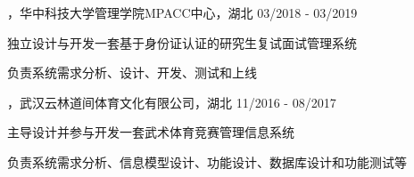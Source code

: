 
\begin{cventries}

\cvexperience
{，华中科技大学管理学院MPACC中心，湖北}
{03/2018 - 03/2019}
{
    \begin{cvitems}
    \item {独立设计与开发一套基于身份证认证的研究生复试面试管理系统}
    \item {负责系统需求分析、设计、开发、测试和上线}
    \end{cvitems}
}

\cvexperience
{，武汉云林道间体育文化有限公司，湖北}
{11/2016 - 08/2017}
{
    \begin{cvitems}
    \item {主导设计并参与开发一套武术体育竞赛管理信息系统}
    \item {负责系统需求分析、信息模型设计、功能设计、数据库设计和功能测试等}
    \end{cvitems}
}

\end{cventries}